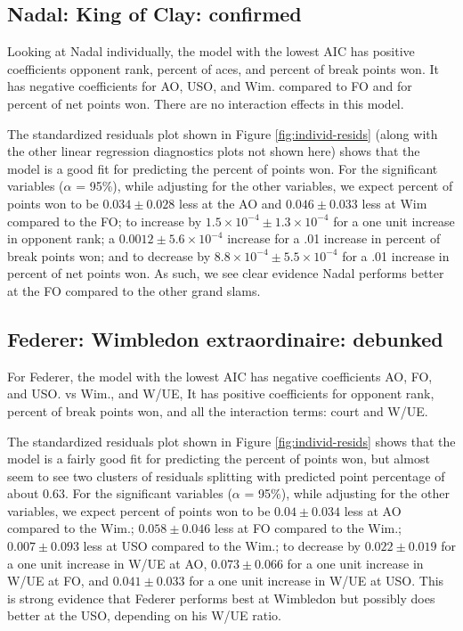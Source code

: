 \documentclass[]{article}
\begin{document}
\hypertarget{nadal-king-of-clay-confirmed}{%
\subsection{Nadal: King of Clay:
confirmed}\label{nadal-king-of-clay-confirmed}}

Looking at Nadal individually, the model with the lowest AIC has
positive coefficients opponent rank, percent of aces, and percent of
break points won. It has negative coefficients for AO, USO, and Wim.
compared to FO and for percent of net points won. There are no
interaction effects in this model.

The standardized residuals plot shown in Figure \ref{fig:individ-resids}
(along with the other linear regression diagnostics plots not shown
here) shows that the model is a good fit for predicting the percent of
points won. For the significant variables (\(\alpha\) = 95\%), while
adjusting for the other variables, we expect percent of points won to be
\(0.034 \pm 0.028\) less at the AO and \(0.046 \pm 0.033\) less at Wim
compared to the FO; to increase by
\(1.5\times 10^{-4}\pm 1.3\times 10^{-4}\) for a one unit increase in
opponent rank; a \(0.0012\pm 5.6\times 10^{-4}\) increase for a .01
increase in percent of break points won; and to decrease by
\(8.8\times 10^{-4} \pm 5.5\times 10^{-4}\) for a .01 increase in
percent of net points won. As such, we see clear evidence Nadal performs
better at the FO compared to the other grand slams.

\hypertarget{federer-wimbledon-extraordinaire-debunked}{%
\subsection{Federer: Wimbledon extraordinaire:
debunked}\label{federer-wimbledon-extraordinaire-debunked}}

For Federer, the model with the lowest AIC has negative coefficients AO,
FO, and USO. vs Wim., and W/UE, It has positive coefficients for
opponent rank, percent of break points won, and all the interaction
terms: court and W/UE.

The standardized residuals plot shown in Figure \ref{fig:individ-resids}
shows that the model is a fairly good fit for predicting the percent of
points won, but almost seem to see two clusters of residuals splitting
with predicted point percentage of about 0.63. For the significant
variables (\(\alpha\) = 95\%), while adjusting for the other variables,
we expect percent of points won to be \(0.04 \pm 0.034\) less at AO
compared to the Wim.; \(0.058\pm 0.046\) less at FO compared to the
Wim.; \(0.007\pm 0.093\) less at USO compared to the Wim.; to decrease
by \(0.022 \pm 0.019\) for a one unit increase in W/UE at AO,
\(0.073 \pm 0.066\) for a one unit increase in W/UE at FO, and
\(0.041 \pm 0.033\) for a one unit increase in W/UE at USO. This is
strong evidence that Federer performs best at Wimbledon but possibly
does better at the USO, depending on his W/UE ratio.
\end{document}
